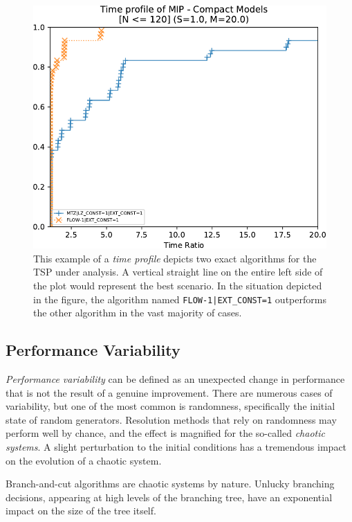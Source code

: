 \begin{figure}[t]
	\centering
	\includegraphics[width=\textwidth]{./Imgs/perfprof-tsp-example/time-ratio20.0.cropped.pdf}
	\caption{
		This example of a \textit{time profile} depicts two exact algorithms for the TSP under analysis.
		A vertical straight line on the entire left side of the plot would represent the best scenario.
		In the situation depicted in the figure, the algorithm named \texttt{FLOW-1|EXT\_CONST=1} outperforms the other algorithm in the vast majority of cases.
	}
	\label{fig:example-of-time-profile-tsp}
\end{figure}

\subsection{Performance Variability}
\label{sec:performance-variability}

\textit{Performance variability} \parencite{lodi2013performance} can be defined as an unexpected change in performance that is not the result of a genuine improvement.
There are numerous cases of variability, but one of the most common is randomness, specifically the initial state of random generators.
Resolution methods that rely on randomness may perform well by chance, and the effect is magnified for the so-called \textit{chaotic systems}.
A slight perturbation to the initial conditions has a tremendous impact on the evolution of a chaotic system.

Branch-and-cut algorithms are chaotic systems by nature.
Unlucky branching decisions, appearing at high levels of the branching tree, have an exponential impact on the size of the tree itself.

